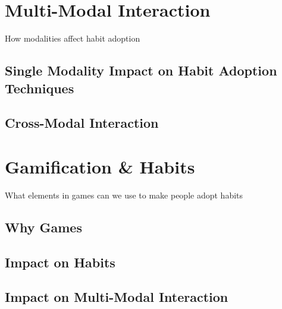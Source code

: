 \newpage
\section{Multi-Modal Interaction}
How modalities affect habit adoption

\subsection{Single Modality Impact on Habit Adoption Techniques}


\subsection{Cross-Modal Interaction}

\newpage
\section{Gamification \& Habits}
What elements in games can we use to make people adopt habits

\subsection{Why Games}

\subsection{Impact on Habits}


\subsection{Impact on Multi-Modal Interaction}